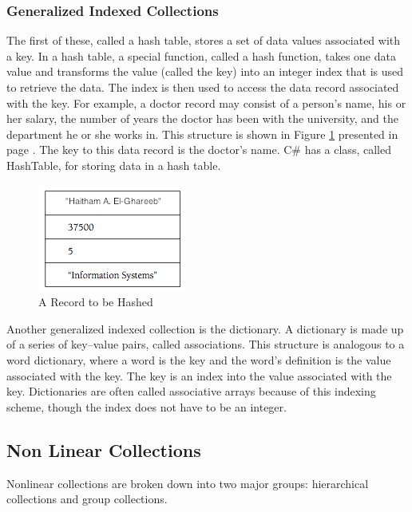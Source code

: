 \documentclass[12pt,a4paper,final,twoside,titlepage]{book}
\begin{document}
\subsubsection{Generalized Indexed Collections}
The first of these, called a hash table, stores a set of data values associated with a key. In a hash table, a special function, called a hash function, takes one data value and transforms the value (called the key) into an integer index that is used to retrieve the data. The index is then used to access the data record associated with the key. For example, a doctor record may consist of a person’s name, his or her salary, the number of years the doctor has been with the university, and the department he or she works in. This structure is shown in Figure \ref{ARecordToBeHashed} presented in page \pageref{ARecordToBeHashed}. The key to this data record is the doctor's name. C\# has a class, called HashTable, for storing data in a hash table.
\begin{figure}
\begin{center}
\includegraphics[scale=0.75]{ARecordToBeHashed}
\end{center}
\caption{A Record to be Hashed}
\label{ARecordToBeHashed}
\end{figure}
Another generalized indexed collection is the dictionary. A dictionary is made up of a series of key–value pairs, called associations. This structure is analogous to a word dictionary, where a word is the key and the word’s definition is the value associated with the key. The key is an index into the value associated with the key. Dictionaries are often called associative arrays because of this indexing scheme, though the index does not have to be an integer.
\subsection{Non Linear Collections}
Nonlinear collections are broken down into two major groups: hierarchical collections and group collections. 
\end{document}

